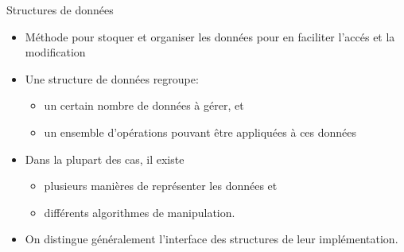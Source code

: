





\begin{frame}{Structures de données}

\begin{itemize}
\item Méthode pour stoquer et organiser les données pour en faciliter
  l'accés et la modification
\item Une structure de données regroupe:
\begin{itemize}
\item un certain nombre de données à gérer, et
\item un ensemble d'opérations pouvant être appliquées à ces données
\end{itemize}
\item Dans la plupart des cas, il existe
\begin{itemize}
\item plusieurs manières de représenter les données et
\item différents algorithmes de manipulation.
\end{itemize}
\item On distingue généralement l'\alert{interface} des structures de
  leur implémentation.
\end{itemize}

\end{frame}

